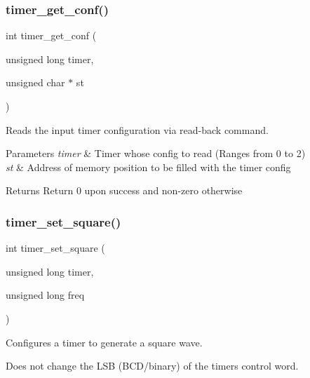 \subsubsection{\texorpdfstring{timer\+\_\+get\+\_\+conf()}{timer\_get\_conf()}}
{\footnotesize\ttfamily int timer\+\_\+get\+\_\+conf (\begin{DoxyParamCaption}\item[{unsigned long}]{timer,  }\item[{unsigned char $\ast$}]{st }\end{DoxyParamCaption})}



Reads the input timer configuration via read-\/back command. 


\begin{DoxyParams}{Parameters}
{\em timer} & Timer whose config to read (Ranges from 0 to 2) \\
\hline
{\em st} & Address of memory position to be filled with the timer config \\
\hline
\end{DoxyParams}
\begin{DoxyReturn}{Returns}
Return 0 upon success and non-\/zero otherwise 
\end{DoxyReturn}
\hypertarget{group__timer_gada4efbb5c88275795526fc45f0814aa3}{}\label{group__timer_gada4efbb5c88275795526fc45f0814aa3} 
\subsubsection{\texorpdfstring{timer\+\_\+set\+\_\+square()}{timer\_set\_square()}}
{\footnotesize\ttfamily int timer\+\_\+set\+\_\+square (\begin{DoxyParamCaption}\item[{unsigned long}]{timer,  }\item[{unsigned long}]{freq }\end{DoxyParamCaption})}



Configures a timer to generate a square wave. 

Does not change the L\+SB (B\+C\+D/binary) of the timer\textquotesingle{}s control word.



